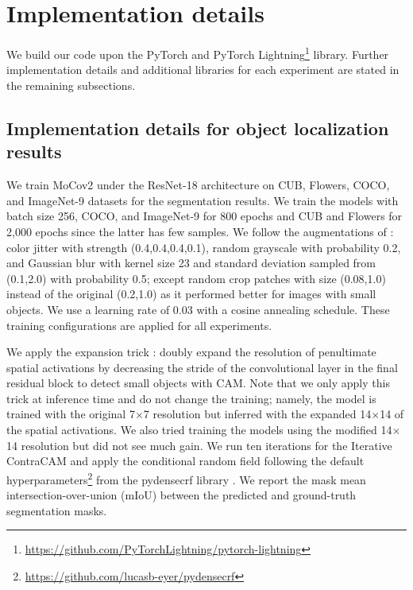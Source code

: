\section{Implementation details}
\label{sec:details}

We build our code upon the PyTorch \citep{paszke2019pytorch} and PyTorch Lightning\footnote{\url{https://github.com/PyTorchLightning/pytorch-lightning}} library. Further implementation details and additional libraries for each experiment are stated in the remaining subsections.


\subsection{Implementation details for object localization results}
\label{sec:details-loc}

We train MoCov2 under the ResNet-18 architecture on CUB, Flowers, COCO, and ImageNet-9 datasets for the segmentation results. We train the models with batch size 256, COCO, and ImageNet-9 for 800 epochs and CUB and Flowers for 2,000 epochs since the latter has few samples. We follow the augmentations of \citet{he2020momentum}: color jitter with strength (0.4,0.4,0.4,0.1), random grayscale with probability 0.2, and Gaussian blur with kernel size 23 and standard deviation sampled from (0.1,2.0) with probability 0.5; except random crop patches with size (0.08,1.0) instead of the original (0.2,1.0) as it performed better for images with small objects. We use a learning rate of 0.03 with a cosine annealing schedule. These training configurations are applied for all experiments.

We apply the expansion trick \citep{choe2020evaluating}: doubly expand the resolution of penultimate spatial activations by decreasing the stride of the convolutional layer in the final residual block to detect small objects with CAM. Note that we only apply this trick at inference time and do not change the training; namely, the model is trained with the original 7$\times$7 resolution but inferred with the expanded 14$\times$14 of the spatial activations. We also tried training the models using the modified 14$\times$14 resolution but did not see much gain. We run ten iterations for the Iterative ContraCAM and apply the conditional random field following the default hyperparameters\footnote{\url{https://github.com/lucasb-eyer/pydensecrf}} from the pydensecrf library \citep{krahenbuhl2011efficient}. We report the mask mean intersection-over-union (mIoU) between the predicted and ground-truth segmentation masks.

